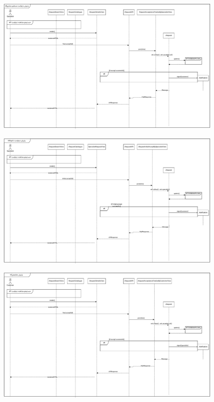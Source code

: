 \eject \pdfpagewidth=16in \pdfpageheight=10in
\begin{figure}[ht!]
	\centering
	\includegraphics[scale=0.8]{figs/design-sequence/3-13.pdf}
\end{figure}
\FloatBarrier
\newpage

\eject \pdfpagewidth=16in \pdfpageheight=10in
\begin{figure}[ht!]
	\centering
	\includegraphics[scale=0.8]{figs/design-sequence/3-14.pdf}
\end{figure}
\FloatBarrier
\newpage


\begin{figure}[ht!]
	\centering
	\includegraphics[scale=0.8]{figs/design-sequence/3-15.pdf}
\end{figure}
\FloatBarrier
\newpage

